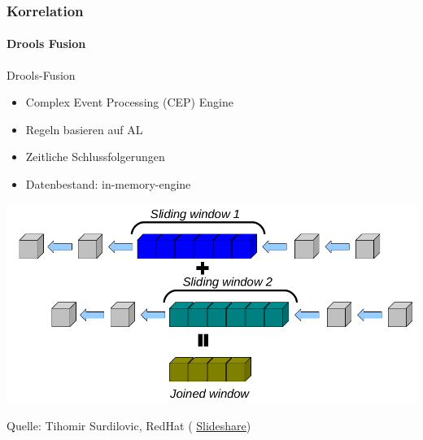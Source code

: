 \begin{frame}
\frametitle{Korrelation}
\framesubtitle{Drools Fusion}
\begin{block}{\centering Drools-Fusion}
    \begin{itemize}
        \item Complex Event Processing (CEP) Engine
        \item Regeln basieren auf AL
        \item Zeitliche Schlussfolgerungen
        \item Datenbestand: in-memory-engine
    \end{itemize}
\end{block}

\begin{center}
    \includegraphics[scale=0.26]{img/drools-slide-00.png}
\end{center}
\vspace{0.3cm}
\footnoterule
\footnotesize{
    Quelle:      Tihomir Surdilovic, RedHat (
\href{https://www.slideshare.net/tsurdilovic/jboss-drools-and-drools-fusion-cep-making-business-rules-react-to-rte}{Slideshare})}

\end{frame}
